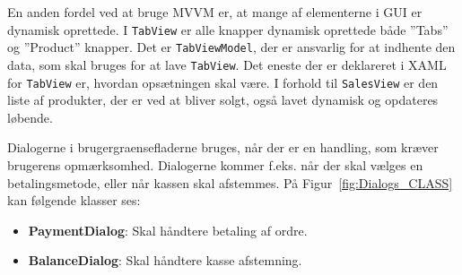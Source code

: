 En anden fordel ved at bruge \gls{MVVM} er, at mange af elementerne i \gls{GUI} er dynamisk oprettede. I \texttt{TabView} er alle knapper dynamisk oprettede både ''Tabs'' og ''Product'' knapper. 
Det er \texttt{TabViewModel}, der er ansvarlig for at indhente den data, som skal bruges for at lave \texttt{TabView}. Det eneste der er deklareret i \gls{XAML} for \texttt{TabView} er, hvordan opsætningen skal være.
I forhold til \texttt{SalesView} er den liste af produkter, der er ved at bliver solgt, også lavet dynamisk og opdateres løbende.


Dialogerne i \gls{brugergraenseflade}rne bruges, når der er en handling, som kræver brugerens opmærksomhed. Dialogerne kommer f.eks. når der skal vælges en betalingsmetode, eller når kassen skal afstemmes. På Figur~\ref{fig:Dialogs_CLASS} kan følgende klasser ses:
\begin{itemize}
	\item \textbf{PaymentDialog}: Skal håndtere betaling af ordre.
	\item \textbf{BalanceDialog}: Skal håndtere kasse afstemning.
\end{itemize}